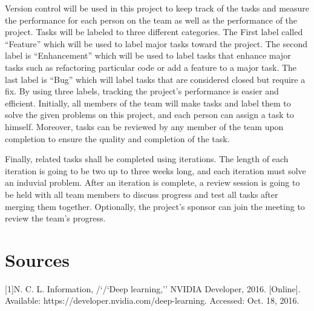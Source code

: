 \documentclass[letterpaper,10pt]{article}
\begin{document}
Version control will be used in this project to keep track of the tasks and measure the performance for each person on the team as well as the performance of the project.
 Tasks will be labeled to three different categories.
 The First label called “Feature” which will be used to label major tasks toward the project.
 The second label is “Enhancement” which will be used to label tasks that enhance major tasks such as refactoring particular code or add a feature to a major task.
 The last label is “Bug” which will label tasks that are considered closed but require a fix.
 By using three labels, tracking the project’s performance is easier and efficient.
 Initially, all members of the team will make tasks and label them to solve the given problems on this project, and each person can assign a task to himself.
 Moreover, tasks can be reviewed by any member of the team upon completion to ensure the quality and completion of the task.


Finally, related tasks shall be completed using iterations.
 The length of each iteration is going to be two up to three weeks long, and each iteration must solve an induvial problem.
 After an iteration is complete, a review session is going to be held with all team members to discuss progress and test all tasks after merging them together.
 Optionally, the project’s sponsor can join the meeting to review the team's progress.


\section{Sources}

[1]N. C. L. Information, /`/`Deep learning,'' NVIDIA Developer, 2016. [Online]. Available: https://developer.nvidia.com/deep-learning. Accessed: Oct. 18, 2016.
\end{document}
